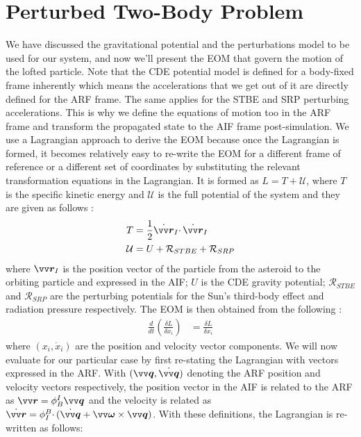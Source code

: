 \section{Perturbed Two-Body Problem}
\label{sec:2BP}
We have discussed the gravitational potential and the perturbations model to be used for our system, and now we'll present the \gls{EOM} that govern the motion of the lofted particle. Note that the \gls{CDE} potential model is defined for a body-fixed frame inherently which means the accelerations that we get out of it are directly defined for the \gls{ARF} frame. The same applies for the \gls{STBE} and \gls{SRP} perturbing accelerations. This is why we define the equations of motion too in the \gls{ARF} frame and transform the propagated state to the \gls{AIF} frame post-simulation.
%
\newline\newline
%
We use a Lagrangian approach to derive the \gls{EOM} because once the Lagrangian is formed, it becomes relatively easy to re-write the \gls{EOM} for a different frame of reference or a different set of coordinates by substituting the relevant transformation equations in the Lagrangian. It is formed as $L=T+\mathcal{U}$, where $T$ is the specific kinetic energy and $\mathcal{U}$ is the full potential of the system and they are given as follows \parencite{scheeresBook}:
\begin{align}
    T &= \frac{1}{2} \dot{\bv{r}}_I \cdotp \dot{\bv{r}}_I
    \label{eqn:lagrangian_kinetic_energy} \\
    \mathcal{U} &= U + \mathcal{R}_{STBE} + \mathcal{R}_{SRP}
    \label{lagrangian_potential}
\end{align}
where $\bv{r}_I$ is the position vector of the particle from the asteroid to the orbiting particle and expressed in the \gls{AIF}; $U$ is the \gls{CDE} gravity potential; $\mathcal{R}_{STBE}$ and $\mathcal{R}_{SRP}$ are the perturbing potentials for the Sun's third-body effect and radiation pressure respectively. The \gls{EOM} is then obtained from the following \parencite{scheeresBook}:
\begin{align}
    \frac{d}{dt} \left(\frac{\delta L}{\delta \dot{x}_i}\right) &= \frac{\delta L}{\delta x_i}
    \label{eqn:lagrange_general_form}
\end{align}
where $(x_i, \dot{x}_i)$ are the position and velocity vector components. We will now evaluate  for our particular case by first re-stating the Lagrangian with vectors expressed in the \gls{ARF}. With $(\bv{q}, \dot{\bv{q}})$ denoting the \gls{ARF} position and velocity vectors respectively, the position vector in the \gls{AIF} is related to the \gls{ARF} as $\bv{r} = \phi_B^I \bv{q}$ and the velocity is related as $\dot{\bv{r}} = \phi_I^B \cdotp (\dot{\bv{q}} + \bv{\omega} \times \bv{q})$. With these definitions, the Lagrangian is re-written as follows:
